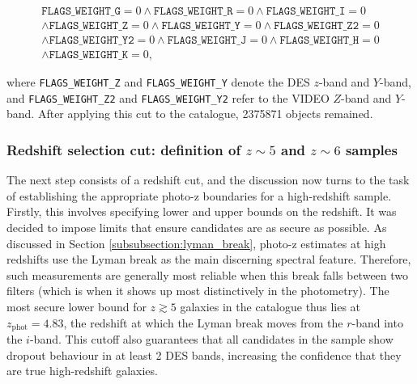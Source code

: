 \begin{multline}
\texttt{FLAGS\_WEIGHT\_G} = 0 \land \texttt{FLAGS\_WEIGHT\_R} = 0 \land \texttt{FLAGS\_WEIGHT\_I} = 0 \\ \land \texttt{FLAGS\_WEIGHT\_Z} = 0  \land \texttt{FLAGS\_WEIGHT\_Y} = 0  \land \texttt{FLAGS\_WEIGHT\_Z2} = 0 \\ \land \texttt{FLAGS\_WEIGHT\_Y2} = 0 \land \texttt{FLAGS\_WEIGHT\_J} = 0 \land \texttt{FLAGS\_WEIGHT\_H} = 0 \\ \land \texttt{FLAGS\_WEIGHT\_K} = 0, 
\end{multline}

\noindent where \texttt{FLAGS\_WEIGHT\_Z} and \texttt{FLAGS\_WEIGHT\_Y} denote the DES $z$-band and $Y$-band, and \texttt{FLAGS\_WEIGHT\_Z2} and \texttt{FLAGS\_WEIGHT\_Y2} refer to the VIDEO $Z$-band and $Y$-band.  After applying this cut to the \DESVIDEO catalogue, \num{2 375 871} objects remained. \par 


\subsubsection{Redshift selection cut: definition of \texorpdfstring{$z\sim5$}{TEXT} and \texorpdfstring{$z\sim6$ samples}{TEXT}}\label{subsubsection:redshift_selection}
The next step consists of a redshift cut, and the discussion now turns to the task of establishing the appropriate photo-z boundaries for a high-redshift sample. Firstly, this involves specifying lower and upper bounds on the redshift. It was decided to impose limits that ensure candidates are as secure as possible. As discussed in Section \ref{subsubsection:lyman_break}, photo-z estimates at high redshifts use the Lyman break as the main discerning spectral feature. Therefore, such measurements are generally most reliable when this break falls between two filters (which is when it shows up most distinctively in the photometry). The most secure lower bound for $z\gtrsim5$ galaxies in the \DESVIDEO catalogue thus lies at $z_{\mathrm{phot}}=4.83$, the redshift at which the Lyman break moves from the $r$-band into the $i$-band. This cutoff also guarantees that all candidates in the sample show dropout behaviour in at least 2 DES bands, increasing the confidence that they are true high-redshift galaxies. \par 

